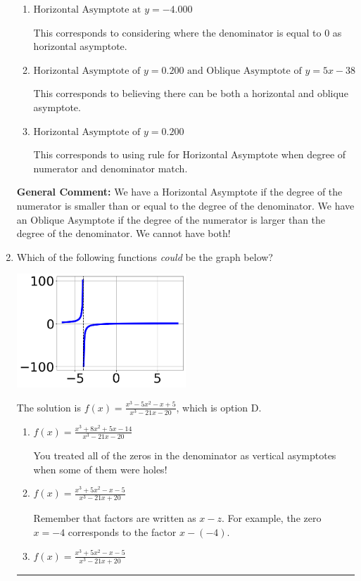 \documentclass{extbook}[14pt]
\newcommand{\litem}[1]{\item #1

\rule{\textwidth}{0.4pt}}
\begin{document}
\begin{enumerate}
{\begin{enumerate}[label=\Alph*.]
* This is the correct option.
\item \( \text{Horizontal Asymptote at } y = -4.000 \)

This corresponds to considering where the denominator is equal to 0 as horizontal asymptote.
\item \( \text{Horizontal Asymptote of } y = 0.200 \text{ and Oblique Asymptote of } y = 5x -38 \)

This corresponds to believing there can be both a horizontal and oblique asymptote.
\item \( \text{Horizontal Asymptote of } y = 0.200  \)

This corresponds to using rule for Horizontal Asymptote when degree of numerator and denominator match.
\end{enumerate}

\textbf{General Comment:} We have a Horizontal Asymptote if the degree of the numerator is smaller than or equal to the degree of the denominator. We have an Oblique Asymptote if the degree of the numerator is larger than the degree of the denominator. We cannot have both!
}
\litem{
Which of the following functions \textit{could} be the graph below?

\begin{center}
    \includegraphics[width=0.5\textwidth]{../Figures/identifyGraphOfRationalFunctionB.png}
\end{center}




The solution is \( f(x)=\frac{x^{3} -5 x^{2} -x + 5}{x^{3} -21 x -20} \), which is option D.\begin{enumerate}[label=\Alph*.]
\item \( f(x)=\frac{x^{3} +8 x^{2} +5 x -14}{x^{3} -21 x -20} \)

You treated all of the zeros in the denominator as vertical asymptotes when some of them were holes!
\item \( f(x)=\frac{x^{3} +5 x^{2} -x -5}{x^{3} -21 x + 20} \)

Remember that factors are written as $x-z$. For example, the zero $x=-4$ corresponds to the factor $x-(-4)$.
\item \( f(x)=\frac{x^{3} +5 x^{2} -x -5}{x^{3} -21 x + 20} \)


\end{enumerate}}
\end{enumerate}
\end{document}
